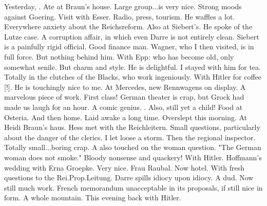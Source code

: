 
Yesterday, . Ate at Braun's house. Large group...is very nice. Strong moods against Goering. Visit with Esser. Radio, press, tourism. He waffles a lot. Everywhere anxiety about the Reichsreform. Also at Siebert's. He spoke of the Lutze case. A corruption affair, in which even Darre is not entirely clean. Siebert is a painfully rigid official. Good finance man.  Wagner, who I then visited, is in full force. But nothing behind him. With Epp: who has become old, only somewhat senile. But charm and style. He is delightful. I stayed with him for tea. Totally in the clutches of the Blacks, who work ingeniously. With Hitler for coffee [!]. He is touchingly nice to me. At Mercedes, new Rennwagens on display. A marvelous piece of work. First class! German theater is crap, but Grock had made us laugh for an hour. A comic genius. . Also, still yet a child! Food at Osteria. And then home. Laid awake a long time. Overslept this morning. At Heidi Braun's haus. Hess met with the Reichleitern. Small questions, particularly about the danger of the clerics. I let loose a storm. Then the regional inspector. Totally small...boring crap. A also touched on the woman question. "The German woman does not smoke." Bloody nonsense and quackery! With Hitler. Hoffmann's wedding with Erna Groepke. Very nice. Frau Raubal. Now hotel. With fresh questions to the Rei.Prop.Leitung. Darre spills idiocy upon idiocy. A dud. Now still much work. French memorandum unacceptable in its proposals, if still nice in form. A whole mountain. This evening back with Hitler.